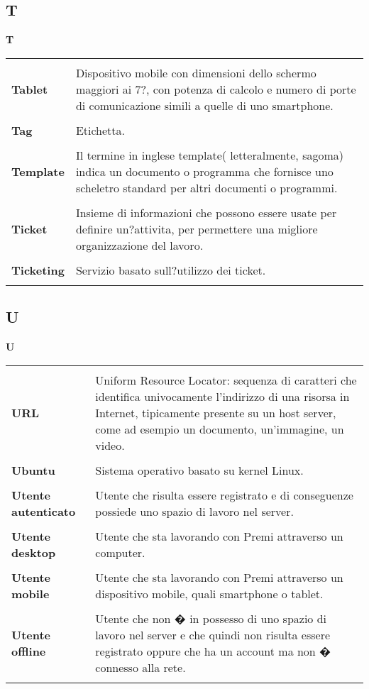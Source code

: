 {\subsection{T} 
\hfill\Huge{\textbf{T}} \\ 
\normalsize 
\begin{longtabu} to 
\toprule \\ 
\textbf{Tablet} & Dispositivo mobile con dimensioni dello schermo maggiori ai 7?, con potenza di calcolo e numero di porte di comunicazione simili a quelle di uno smartphone. \\ 
 \\ 
\textbf{Tag} & Etichetta. \\ 
 \\ 
\textbf{Template} & Il termine in inglese template( letteralmente, sagoma) indica un documento o programma che fornisce uno scheletro standard per altri documenti o programmi. \\ 
 \\ 
\textbf{Ticket} & Insieme di informazioni che possono essere usate per definire un?attivita, per permettere una migliore organizzazione del lavoro. \\ 
 \\ 
\textbf{Ticketing} & Servizio basato sull?utilizzo dei ticket. \\ 
 \\ 
\end{longtabu} 
\newpage 
\subsection{U} 
\hfill\Huge{\textbf{U}} \\ 
\normalsize 
\begin{longtabu} to 
\toprule \\ 
\textbf{URL} & Uniform Resource Locator: sequenza di caratteri che identifica univocamente l'indirizzo di una risorsa in Internet, tipicamente presente su un host server, come ad esempio un documento, un'immagine, un video. \\ 
 \\ 
\textbf{Ubuntu} & Sistema operativo basato su kernel Linux. \\ 
 \\ 
\textbf{Utente autenticato} & Utente che risulta essere registrato e di conseguenze possiede uno spazio di lavoro nel server. \\ 
 \\ 
\textbf{Utente desktop} & Utente che sta lavorando con Premi attraverso un computer. \\ 
 \\ 
\textbf{Utente mobile} & Utente che sta lavorando con Premi attraverso un dispositivo mobile, quali smartphone o tablet. \\ 
 \\ 
\textbf{Utente offline} & Utente che non � in possesso di uno spazio di lavoro nel server e che quindi non risulta essere registrato oppure che ha un account ma non � connesso alla rete. \\ 
 \\ 
\end{longtabu} 
\newpage 
}
